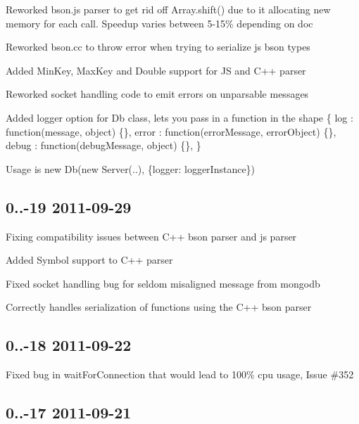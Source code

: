 \begin{DoxyItemize}
\item Reworked bson.\+js parser to get rid off Array.\+shift() due to it allocating new memory for each call. Speedup varies between 5-\/15\% depending on doc
\item Reworked bson.\+cc to throw error when trying to serialize js bson types
\item Added Min\+Key, Max\+Key and Double support for JS and C++ parser
\item Reworked socket handling code to emit errors on unparsable messages
\item Added logger option for Db class, lets you pass in a function in the shape \{ log \+: function(message, object) \{\}, error \+: function(error\+Message, error\+Object) \{\}, debug \+: function(debug\+Message, object) \{\}, \}

Usage is new Db(new Server(..), \{logger\+: logger\+Instance\})
\end{DoxyItemize}

\subsection*{0..-\/19 2011-\/09-\/29 }


\begin{DoxyItemize}
\item Fixing compatibility issues between C++ bson parser and js parser
\item Added Symbol support to C++ parser
\item Fixed socket handling bug for seldom misaligned message from mongodb
\item Correctly handles serialization of functions using the C++ bson parser
\end{DoxyItemize}

\subsection*{0..-\/18 2011-\/09-\/22 }


\begin{DoxyItemize}
\item Fixed bug in wait\+For\+Connection that would lead to 100\% cpu usage, Issue \#352
\end{DoxyItemize}

\subsection*{0..-\/17 2011-\/09-\/21 }


